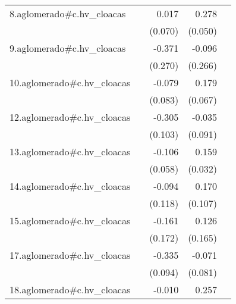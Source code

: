 {\begin{longtable}{l*{4}{D{.}{.}{-1}}}
\addlinespace
8.aglomerado#c.hv\_cloacas&                     &       0.017         &       0.278\sym{***}&                     \\
            &                     &     (0.070)         &     (0.050)         &                     \\
\addlinespace
9.aglomerado#c.hv\_cloacas&                     &      -0.371         &      -0.096         &                     \\
            &                     &     (0.270)         &     (0.266)         &                     \\
\addlinespace
10.aglomerado#c.hv\_cloacas&                     &      -0.079         &       0.179\sym{**} &                     \\
            &                     &     (0.083)         &     (0.067)         &                     \\
\addlinespace
12.aglomerado#c.hv\_cloacas&                     &      -0.305\sym{**} &      -0.035         &                     \\
            &                     &     (0.103)         &     (0.091)         &                     \\
\addlinespace
13.aglomerado#c.hv\_cloacas&                     &      -0.106         &       0.159\sym{***}&                     \\
            &                     &     (0.058)         &     (0.032)         &                     \\
\addlinespace
14.aglomerado#c.hv\_cloacas&                     &      -0.094         &       0.170         &                     \\
            &                     &     (0.118)         &     (0.107)         &                     \\
\addlinespace
15.aglomerado#c.hv\_cloacas&                     &      -0.161         &       0.126         &                     \\
            &                     &     (0.172)         &     (0.165)         &                     \\
\addlinespace
17.aglomerado#c.hv\_cloacas&                     &      -0.335\sym{***}&      -0.071         &                     \\
            &                     &     (0.094)         &     (0.081)         &                     \\
\addlinespace
18.aglomerado#c.hv\_cloacas&                     &      -0.010         &       0.257\sym{***}&                     \\

\end{longtable}}
